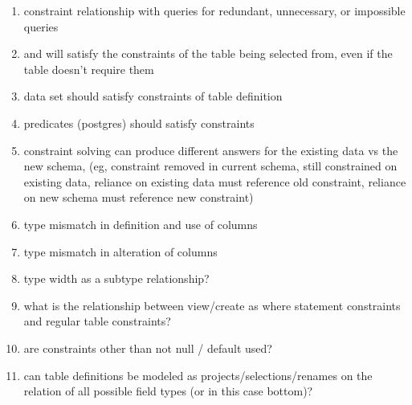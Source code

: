 \documentclass[12pt]{article}
\begin{document}
\begin{enumerate}
  \item constraint relationship with queries for redundant, unnecessary, or impossible queries
  \item {} and  will satisfy the constraints of the table being selected from, even if the table doesn't require them
  \item {} data set should satisfy constraints of table definition
  \item {} predicates (postgres) should satisfy constraints
  \item constraint solving can produce different answers for the existing data vs the new schema, (eg, constraint removed in current schema, still constrained on existing data, reliance on existing data must reference old constraint, reliance on new schema must reference new constraint)
  \item type mismatch in definition and use of columns
  \item type mismatch in alteration of columns
  \item type width as a subtype relationship?
  \item what is the relationship between view/create as where statement constraints and regular table constraints?
  \item are constraints other than not null / default used?
  \item can table definitions be modeled as projects/selections/renames on the relation of all possible field types (or in this case bottom)?
\end{enumerate}
\end{document}
